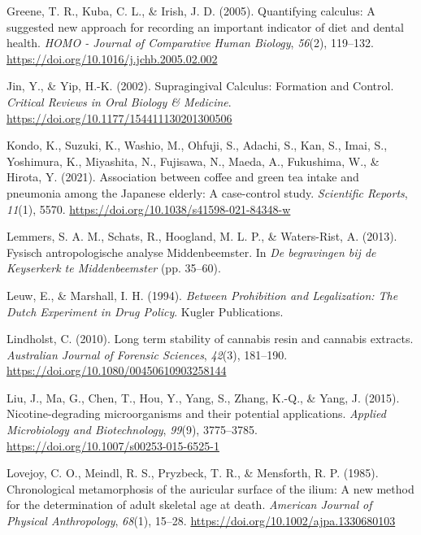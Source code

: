 \documentclass[
  b5paper,
]{book}
\newlength{\cslhangindent}
\newlength{\cslentryspacingunit} %
\newenvironment{CSLReferences}[2] %
 {%
  \setlength{\parindent}{0pt}
  \ifodd #1
  \let\oldpar\par
  \def\par{\hangindent=\cslhangindent\oldpar}
  \fi
  \setlength{\parskip}{#2\cslentryspacingunit}
 }%
 {}
\begin{document}
\begin{CSLReferences}{1}{0}
\leavevmode{}%
Greene, T. R., Kuba, C. L., \& Irish, J. D. (2005). Quantifying
calculus: {A} suggested new approach for recording an important
indicator of diet and dental health. \emph{HOMO - Journal of Comparative
Human Biology}, \emph{56}(2), 119--132.
\url{https://doi.org/10.1016/j.jchb.2005.02.002}

\leavevmode{}%
Jin, Y., \& Yip, H.-K. (2002). Supragingival {Calculus}: {Formation} and
{Control}. \emph{Critical Reviews in Oral Biology \& Medicine}.
\url{https://doi.org/10.1177/154411130201300506}

\leavevmode{}%
Kondo, K., Suzuki, K., Washio, M., Ohfuji, S., Adachi, S., Kan, S.,
Imai, S., Yoshimura, K., Miyashita, N., Fujisawa, N., Maeda, A.,
Fukushima, W., \& Hirota, Y. (2021). Association between coffee and
green tea intake and pneumonia among the {Japanese} elderly: A
case-control study. \emph{Scientific Reports}, \emph{11}(1), 5570.
\url{https://doi.org/10.1038/s41598-021-84348-w}

\leavevmode{}%
Lemmers, S. A. M., Schats, R., Hoogland, M. L. P., \& Waters-Rist, A.
(2013). {Fysisch antropologische analyse Middenbeemster}. In \emph{{De
begravingen bij de Keyserkerk te Middenbeemster}} (pp. 35--60).

\leavevmode{}%
Leuw, E., \& Marshall, I. H. (1994). \emph{Between {Prohibition} and
{Legalization}: {The Dutch Experiment} in {Drug Policy}}. {Kugler
Publications}.

\leavevmode{}%
Lindholst, C. (2010). Long term stability of cannabis resin and cannabis
extracts. \emph{Australian Journal of Forensic Sciences}, \emph{42}(3),
181--190. \url{https://doi.org/10.1080/00450610903258144}

\leavevmode{}%
Liu, J., Ma, G., Chen, T., Hou, Y., Yang, S., Zhang, K.-Q., \& Yang, J.
(2015). Nicotine-degrading microorganisms and their potential
applications. \emph{Applied Microbiology and Biotechnology},
\emph{99}(9), 3775--3785.
\url{https://doi.org/10.1007/s00253-015-6525-1}

\leavevmode{}%
Lovejoy, C. O., Meindl, R. S., Pryzbeck, T. R., \& Mensforth, R. P.
(1985). Chronological metamorphosis of the auricular surface of the
ilium: {A} new method for the determination of adult skeletal age at
death. \emph{American Journal of Physical Anthropology}, \emph{68}(1),
15--28. \url{https://doi.org/10.1002/ajpa.1330680103}


\end{CSLReferences}
\end{document}
